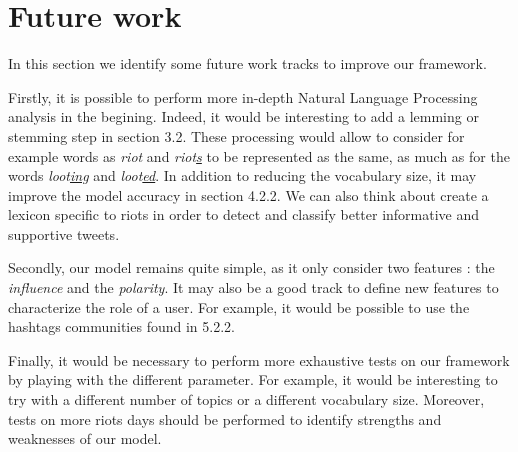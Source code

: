 \documentclass[a4paper,twoside,12pt,openright]{report}
\begin{document}
\newpage
\section{Future work}
In this section we identify some future work tracks to improve our framework.

Firstly, it is possible to perform more in-depth Natural Language Processing analysis in the begining. Indeed, it would be interesting to add a lemming or stemming step in section 3.2. These processing would allow to consider for example words as \emph{riot} and \emph{riot\underline{s}} to be represented as the same, as much as for the words \emph{loot\underline{ing}} and \emph{loot\underline{ed}}. In addition to reducing the vocabulary size, it may improve the model accuracy in section 4.2.2. We can also think about create a lexicon specific to riots in order to detect and classify better informative and supportive tweets.

Secondly, our model remains quite simple, as it only consider two features : the \emph{influence} and the \emph{polarity}. It may also be a good track to define new features to characterize the role of a user. For example, it would be possible to use the hashtags communities found in 5.2.2.

Finally, it would be necessary to perform more exhaustive tests on our framework by playing with the different parameter. For example, it would be interesting to try with a different number of topics or a different vocabulary size. Moreover, tests on more riots days should be performed to identify strengths and weaknesses of our model.



\end{document}
